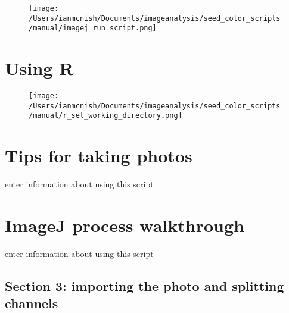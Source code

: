 \documentclass[12pt]{article}
\begin{document}
\begin{figure}[H]
	\centering
	\texttt{[image: /Users/ianmcnish/Documents/imageanalysis/seed\_color\_scripts/manual/imagej\_run\_script.png]}
	\label{fig:imagej_run_script}
\end{figure}

\section{Using R}\label{sec:r}

\begin{figure}[H]
	\centering
	\texttt{[image: /Users/ianmcnish/Documents/imageanalysis/seed\_color\_scripts/manual/r\_set\_working\_directory.png]}
	\label{fig:r_set_working_directory}
\end{figure}

\section{Tips for taking photos}\label{sec:photos}

enter information about using this script

\section{ImageJ process walkthrough}\label{sec:imagej_process}

enter information about using this script

\subsection{Section 3: importing the photo and splitting channels}\label{sec:imagej_import_split}
\end{document}
